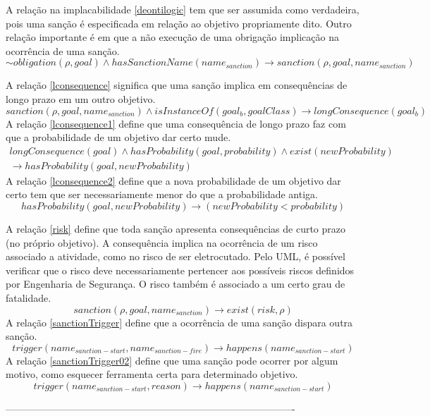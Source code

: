 \documentclass[a0,portrait]{a0poster}
\begin{document}
\begin{multicols}{2}
A relação na implacabilidade \ref{deontilogic} tem que ser assumida como verdadeira, pois uma sanção é especificada em 
relação ao objetivo propriamente dito. Outro relação importante é \label{sanction} em que a não execução de uma obrigação
implicação na ocorrência de uma sanção.
\begin{equation}\label{sanction}
		  \sim obligation(\rho,goal) \wedge hasSanctionName(name_{sanction}) \to sanction(\rho,goal,name_{sanction})
\end{equation}

A relação \ref{lconsequence} significa que uma sanção implica em consequências de longo prazo em um outro objetivo.
\begin{equation}\label{lconsequence}
		  sanction(\rho,goal,name_{sanction}) \wedge isInstanceOf(goal_{b},goalClass) \to longConsequence(goal_{b}) 
\end{equation}
A relação \ref{lconsequence1} define que uma consequência de longo prazo faz com que a probabilidade de um objetivo dar certo
mude.
\begin{eqnarray}\label{lconsequence1}
		  longConsequence(goal) \wedge hasProbability(goal,probability) \wedge exist(newProbability) \nonumber \\ 
		  \to hasProbability(goal,newProbability)
\end{eqnarray}
A relação \ref{lconsequence2} define que a nova probabilidade de um objetivo dar certo tem que ser necessariamente menor
do que a probabilidade antiga.
\begin{equation}\label{lconsequence2}
	 hasProbability(goal,newProbability)\to (newProbability < probability)
\end{equation}


A relação \ref{risk} define que toda sanção apresenta consequências de curto prazo (no próprio objetivo). A consequência
implica na ocorrência de um risco associado a atividade, como no risco de ser eletrocutado. Pelo UML, é possível verificar
que o risco deve necessariamente pertencer aos possíveis riscos definidos por Engenharia de Segurança. O risco também 
é associado a um certo grau de fatalidade.
\begin{equation}\label{risk}
	sanction(\rho,goal,name_{sanction}) \to exist(risk,\rho) 
\end{equation}
A relação \ref{sanctionTrigger} define que a ocorrência de uma sanção dispara outra sanção.
\begin{equation}\label{sanctionTrigger}
		  trigger(name_{sanction-start},name_{sanction-fire}) \to happens(name_{sanction-start})
\end{equation}
A relação \ref{sanctionTrigger02} define que uma sanção pode ocorrer por algum motivo, como esquecer ferramenta certa para determinado objetivo.
\begin{equation}\label{sanctionTrigger02}
		  trigger(name_{sanction-start},reason) \to happens(name_{sanction-start})
\end{equation}


----------------------------------------------------------------------------------------

\end{multicols}
\end{document}

